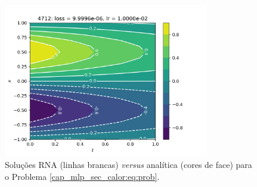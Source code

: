 \begin{figure}[H]
  \centering
  \includegraphics[width=0.8\textwidth]{./cap_mlp/dados/fig_mlp_calor/fig}
  \caption{Soluções RNA (linhas brancas) \textit{versus} analítica (cores de face) para o Problema \ref{cap_mlp_sec_calor:eq:prob}.}
  \label{cap_mlp_sec_calor:fig:rna_calor}
\end{figure}

